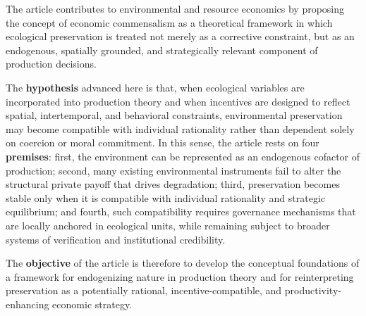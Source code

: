 The article contributes to environmental and resource economics by proposing the concept of economic commensalism as a theoretical framework in which ecological preservation is treated not merely as a corrective constraint, but as an endogenous, spatially grounded, and strategically relevant component of production decisions.



The \textbf{hypothesis} advanced here is that, when ecological variables are incorporated into production theory and when incentives are designed to reflect spatial, intertemporal, and behavioral constraints, environmental preservation may become compatible with individual rationality rather than dependent solely on coercion or moral commitment. In this sense, the article rests on four \textbf{premises}: first, the environment can be represented as an endogenous cofactor of production; second, many existing environmental instruments fail to alter the structural private payoff that drives degradation; third, preservation becomes stable only when it is compatible with individual rationality and strategic equilibrium; and fourth, such compatibility requires governance mechanisms that are locally anchored in ecological units, while remaining subject to broader systems of verification and institutional credibility.

The \textbf{objective} of the article is therefore to develop the conceptual foundations of a framework for endogenizing nature in production theory and for reinterpreting preservation as a potentially rational, incentive-compatible, and productivity-enhancing economic strategy. 



